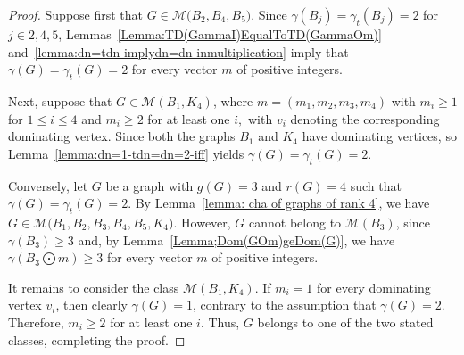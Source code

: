 \documentclass[12pt]{amsart}
\theoremstyle{plain}
\theoremstyle{definition}
\begin{document}
\begin{proof}
Suppose first that $G\in\mathcal{M}\bigl(B_2,B_4,B_5\bigr)$. Since $\gamma(B_j)=\gamma_t(B_j)=2$ for $j\in{2,4,5}$, Lemmas~\ref{Lemma:TD(GammaI)EqualToTD(GammaOm)} and~\ref{lemma:dn=tdn-implydn=dn-inmultiplication} imply that $\gamma(G)=\gamma_t(G)=2$ for every vector $m$ of positive integers.

Next, suppose that $G\in\mathcal{M}(B_1,K_4)$, where $m=(m_1,m_2,m_3,m_4)$ with $m_i\geq 1$ for $1\leq i\leq 4$ and $m_i\geq 2$ for at least one $i,$ with $v_i$ denoting the corresponding dominating vertex. Since both the graphs $B_1$ and $K_4$ have dominating vertices, so Lemma~\ref{lemma:dn=1-tdn=dn=2-iff} yields $\gamma(G)=\gamma_t(G)=2$.

Conversely, let $G$ be a graph with $g(G)=3$ and $r(G)=4$ such that $\gamma(G)=\gamma_t(G)=2$. By Lemma~\ref{lemma: cha of graphs of rank 4}, we have $G\in\mathcal{M}\bigl(B_1,B_2,B_3,B_4,B_5,K_4\bigr)$. However, $G$ cannot belong to $\mathcal{M}(B_3)$, since $\gamma(B_3)\geq 3$ and, by Lemma~\ref{Lemma;Dom(GOm)geDom(G)}, we have $\gamma(B_3\bigodot m)\geq 3$ for every vector $m$ of positive integers.

It remains to consider the class $\mathcal{M}(B_1,K_4)$. If $m_i=1$ for every dominating vertex $v_i$, then clearly $\gamma(G)=1$, contrary to the assumption that $\gamma(G)=2$. Therefore, $m_i\geq 2$ for at least one $i$. Thus, $G$ belongs to one of the two stated classes, completing the proof.
\end{proof}
\end{document}
